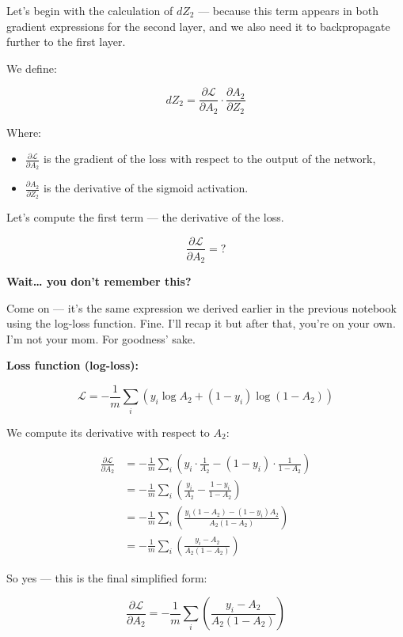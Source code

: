 \documentclass[11pt]{article}
\begin{document}
Let’s begin with the calculation of \( dZ_2 \) —  
because this term appears in both gradient expressions for the second layer,  
and we also need it to backpropagate further to the first layer.

We define:

\[
dZ_2 = \frac{\partial \mathcal{L}}{\partial A_2} \cdot \frac{\partial A_2}{\partial Z_2}
\]

Where:
\begin{itemize}
    \item \( \frac{\partial \mathcal{L}}{\partial A_2} \) is the gradient of the loss with respect to the output of the network,
    \item \( \frac{\partial A_2}{\partial Z_2} \) is the derivative of the sigmoid activation.
\end{itemize}

Let’s compute the first term — the derivative of the loss.

\[
\frac{\partial \mathcal{L}}{\partial A_2} = ?
\]

\textbf{Wait… you don’t remember this?}

Come on — it’s the same expression we derived earlier in the previous notebook using the log-loss function.  
Fine. I’ll recap it but after that, you're on your own. I'm not your mom. For goodness' sake.

\textbf{Loss function (log-loss):}

\[
\mathcal{L} = -\frac{1}{m} \sum_i \left( y_i \log A_2 + (1 - y_i) \log(1 - A_2) \right)
\]

We compute its derivative with respect to \( A_2 \):

\[
\begin{aligned}
\frac{\partial \mathcal{L}}{\partial A_2} 
&= -\frac{1}{m} \sum_i \left( y_i \cdot \frac{1}{A_2} - (1 - y_i) \cdot \frac{1}{1 - A_2} \right) \\
&= -\frac{1}{m} \sum_i \left( \frac{y_i}{A_2} - \frac{1 - y_i}{1 - A_2} \right) \\
&= -\frac{1}{m} \sum_i \left( \frac{y_i(1 - A_2) - (1 - y_i)A_2}{A_2(1 - A_2)} \right) \\
&= -\frac{1}{m} \sum_i \left( \frac{y_i - A_2}{A_2(1 - A_2)} \right)
\end{aligned}
\]

So yes — this is the final simplified form:

\[
\boxed{
\frac{\partial \mathcal{L}}{\partial A_2}
= -\frac{1}{m} \sum_i \left( \frac{y_i - A_2}{A_2(1 - A_2)} \right)
}
\]
\end{document}
